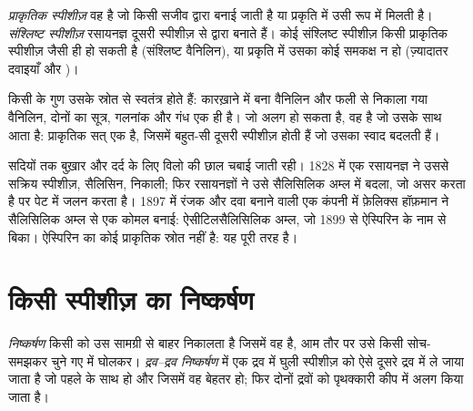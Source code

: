 \begin{definition}[प्राकृतिक और संश्लिष्ट स्पीशीज़]\label{def:g10:chemical-species:natural}
\emph{प्राकृतिक स्पीशीज़} वह  है
जो किसी सजीव द्वारा बनाई जाती है या प्रकृति में उसी रूप में मिलती है। \emph{संश्लिष्ट
स्पीशीज़} रसायनज्ञ दूसरी स्पीशीज़ से  द्वारा बनाते हैं। कोई संश्लिष्ट स्पीशीज़ किसी प्राकृतिक स्पीशीज़ जैसी
ही हो सकती है (संश्लिष्ट वैनिलिन), या प्रकृति में उसका कोई समकक्ष न हो (ज़्यादातर
दवाइयाँ और )।
\end{definition}

\begin{proposition}[एक ही स्पीशीज़, एक ही गुण]\label{prop:g10:chemical-species:same}
किसी  के गुण उसके स्रोत से स्वतंत्र होते हैं:
कारख़ाने में बना वैनिलिन और फली से निकाला गया वैनिलिन, दोनों का सूत्र, गलनांक
और गंध एक ही है। जो अलग हो सकता है, वह है जो उसके साथ आता है: प्राकृतिक सत्
एक  है, जिसमें बहुत-सी दूसरी स्पीशीज़ होती हैं जो उसका स्वाद
बदलती हैं।
\end{proposition}

\begin{history}[विलो की छाल से ऐस्पिरिन तक, 1828--1899]
सदियों तक बुख़ार और दर्द के लिए विलो की छाल चबाई जाती रही। 1828 में एक
रसायनज्ञ ने उससे सक्रिय स्पीशीज़, सैलिसिन, निकाली; फिर रसायनज्ञों ने उसे
सैलिसिलिक अम्ल में बदला, जो असर करता है पर पेट में जलन करता है। 1897 में
रंजक और दवा बनाने वाली एक कंपनी में फ़ेलिक्स हॉफ़मान ने सैलिसिलिक अम्ल से एक
कोमल  बनाई: ऐसीटिलसैलिसिलिक अम्ल, जो 1899 से ऐस्पिरिन के नाम से
बिका। ऐस्पिरिन का कोई प्राकृतिक स्रोत नहीं है: यह पूरी तरह  है।
\end{history}

\section{किसी स्पीशीज़ का निष्कर्षण}

\begin{definition}[निष्कर्षण और द्रव--द्रव निष्कर्षण]\label{def:g10:chemical-species:extraction}
\emph{निष्कर्षण} किसी  को उस सामग्री से बाहर
निकालता है जिसमें वह है, आम तौर पर उसे किसी सोच-समझकर चुने गए  में घोलकर।
\emph{द्रव--द्रव निष्कर्षण} में
एक द्रव में घुली स्पीशीज़ को ऐसे दूसरे द्रव में ले जाया जाता है जो पहले के साथ
 हो और जिसमें वह बेहतर  हो;
फिर दोनों द्रवों को पृथक्कारी कीप में अलग किया जाता है।
\end{definition}

